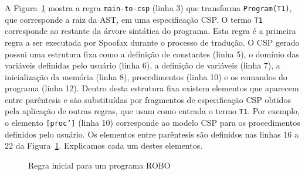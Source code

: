 A Figura~\ref{fig:rules} mostra a regra \texttt{main-to-csp} (linha 3) que transforma \texttt{Program(T1)}, que corresponde a raiz da AST, em uma especificação CSP. O termo \texttt{T1} corresponde ao restante da árvore sintática do programa. Esta regra é a primeira regra a ser executada por Spoofax durante o processo de tradução. O CSP gerado possui uma estrutura fixa como a definição de constantes (linha 5), o domínio das variáveis definidas pelo usuário (linha 6), a definição de variáveis (linha 7), a inicialização da memória (linha 8), procedimentos (linha 10) e os comandos do programa (linha 12). Dentro desta estrutura fixa existem elementos que aparecem entre parêntesis e são substituídas por fragmentos de especificação CSP obtidos pela aplicação de outras regras, que usam como entrada o termo \texttt{T1}. Por exemplo, o elemento \texttt{[proc']} (linha 10) corresponde ao modelo CSP para os procedimentos definidos pelo usuário. Os elementos entre parêntesis são definidos nas linhas 16 a 22 da Figura~\ref{fig:rules}. Explicamos cada um destes elementos.


\begin{figure}[!h]
\centering
\caption{Regra inicial para um programa ROBO}

\label{fig:rules}
\end{figure}


